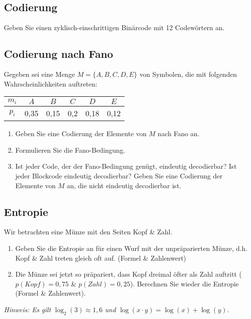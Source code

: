 \documentclass{exercisesheet}
\begin{document}
\subsection{Codierung}
Geben Sie einen zyklisch-einschrittigen Binärcode mit 12 Codewörtern an.

\subsection{Codierung nach Fano}
Gegeben sei eine Menge $M = \{A, B, C, D, E\}$ von Symbolen, die mit folgenden Wahrscheinlichkeiten auftreten:
\begin{center}
  \begin{tabular}{c|ccccc}
    $m_i$ & $A$  & $B$  & $C$ & $D$  & $E$  \\
    \hline
    $p_i$ & 0,35 & 0,15 & 0,2 & 0,18 & 0,12 \\
  \end{tabular}
\end{center}
\begin{enumerate}
  \item\label{fano:1} Geben Sie eine Codierung der Elemente von $M$ nach Fano an.
  \item Formulieren Sie die Fano-Bedingung.
  \item Ist jeder Code, der der Fano-Bedingung genügt, eindeutig decodierbar? Ist jeder Blockcode eindeutig decodierbar? Geben Sie eine Codierung der Elemente von $M$ an, die nicht eindeutig decodierbar ist.
\end{enumerate}

\subsection{Entropie}
Wir betrachten eine Münze mit den Seiten Kopf \& Zahl.
\begin{enumerate}
  \item Geben Sie die Entropie an für einen Wurf mit der unpräparierten Münze, d.h. Kopf \& Zahl treten gleich oft auf. (Formel \& Zahlenwert)
  \item Die Münze sei jetzt so präpariert, dass Kopf dreimal öfter als Zahl auftritt ($p(Kopf) = 0,75$ \& $p(Zahl) = 0,25$). Berechnen Sie wieder die Entropie (Formel \& Zahlenwert).
\end{enumerate}
\textit{Hinweis: Es gilt $\log_2(3) \approx 1,6$ und $\log(x \cdot y) = \log(x) + \log(y)$.}
\end{document}
